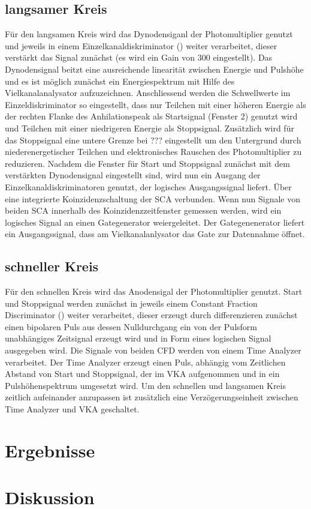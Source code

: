 \documentclass[a4paper,12pt]{article}
\begin{document}
\subsection*{langsamer Kreis}
	Für den langsamen Kreis wird das Dynodensiganl der Photomultiplier genutzt und jeweils in einem 
	Einzelkanaldiskriminator () weiter verarbeitet, dieser verstärkt das Signal zunächst (es wird
	ein Gain von 300 eingestellt). 
	Das Dynodensignal beitzt eine ausreichende linearität zwischen Energie und Pulshöhe und es ist möglich
	zunächst ein Energiespektrum mit Hilfe des Vielkanalanalysator aufzuzeichnen.
	Anschliessend werden die Schwellwerte im Einzeldiskriminator so eingestellt, dass nur Teilchen mit einer höheren
	Energie als der rechten Flanke des Anhilationspeak als Startsignal (Fenster 2) genutzt wird und Teilchen
	mit einer niedrigeren Energie als Stoppsignal. Zusätzlich wird für das Stoppsignal eine untere Grenze bei ???
	eingestellt um den Untergrund durch niederenergetischer Teilchen und elektronisches Rauschen des Photomultiplier
	zu reduzieren. Nachdem die Fenster für Start und Stoppsignal zunächst mit dem verstärkten Dynodensignal eingestellt sind,
	wird nun ein Ausgang der Einzelkanaldiskriminatoren genutzt, der logisches Ausgangssignal liefert.
	Über eine integrierte Koinzidenzschaltung der SCA verbunden. Wenn nun Signale von beiden SCA innerhalb des Koinzidenzzeitfenster
	gemessen werden, wird ein logisches Signal an einen Gategenerator weiergeleitet. Der Gategenenerator liefert ein Ausgangssignal, dass
	am Vielkanalanlysator das Gate zur Datennahme öffnet.
\subsection*{schneller Kreis}
	Für den schnellen Kreis wird das Anodensigal der Photomultiplier genutzt. Start und Stoppsignal werden zunächst in jeweils einem Constant
	Fraction Discriminator () weiter verarbeitet, dieser erzeugt durch differenzieren zunächst einen bipolaren Puls aus dessen Nulldurchgang
	ein von der Pulsform unabhängiges Zeitsignal erzeugt wird und in Form eines logischen Signal ausgegeben wird. Die Signale von beiden
	CFD werden von einem Time Analyzer verarbeitet. Der Time Analyzer erzeugt einen Puls, abhängig vom Zeitlichen Abstand von Start und Stoppsignal,
	der im VKA aufgenommen und in ein Pulshöhenspektrum umgesetzt wird. Um den schnellen und langsamen Kreis zeitlich aufeinander 
	anzupassen ist zusätzlich eine Verzögerungseinheit zwischen Time Analyzer und VKA geschaltet.
\section{Ergebnisse}

\section{Diskussion}
\end{document}
